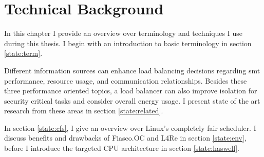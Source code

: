 \chapter{Technical Background}
\label{sec:state}







In this chapter I provide an overview over terminology and techniques I use
during this thesis.
I begin with an introduction to basic terminology in section \ref{state:term}.

Different information sources can enhance load balancing decisions regarding
\gls{smt} performance, resource usage, and communication relationships.
Besides these three performance oriented topics, a load balancer can also
improve isolation for security critical tasks and consider overall energy
usage.
I present state of the art research from these areas in section \ref{state:related}.

In section \ref{state:cfs}, I give an overview over Linux's completely fair
scheduler.
I discuss benefits and drawbacks of Fiasco.OC and L4Re in section
\ref{state:env}, before I introduce the targeted CPU architecture in section
\ref{state:haswell}.













\cleardoublepage


